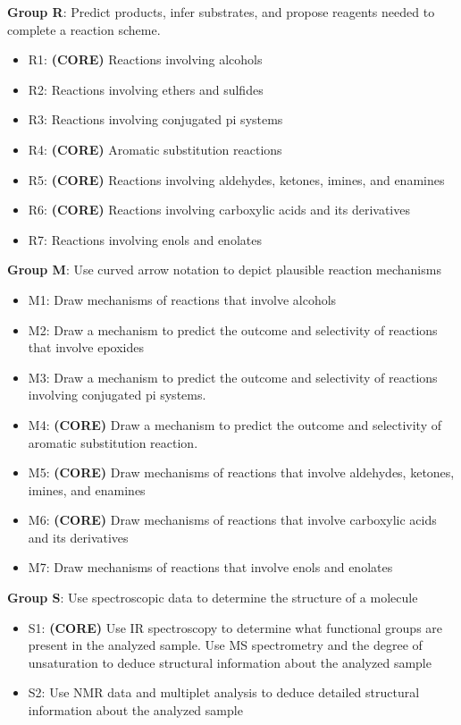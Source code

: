 \textbf{Group R}: Predict products, infer substrates, and propose
reagents needed to complete a reaction scheme.

\begin{itemize}
\tightlist
\item
  R1: \textbf{(CORE)} Reactions involving alcohols
\item
  R2: Reactions involving ethers and sulfides
\item
  R3: Reactions involving conjugated pi systems
\item
  R4: \textbf{(CORE)} Aromatic substitution reactions
\item
  R5: \textbf{(CORE)} Reactions involving aldehydes, ketones, imines,
  and enamines
\item
  R6: \textbf{(CORE)} Reactions involving carboxylic acids and its
  derivatives
\item
  R7: Reactions involving enols and enolates
\end{itemize}

\textbf{Group M}: Use curved arrow notation to depict plausible reaction
mechanisms

\begin{itemize}
\tightlist
\item
  M1: Draw mechanisms of reactions that involve alcohols
\item
  M2: Draw a mechanism to predict the outcome and selectivity of
  reactions that involve epoxides
\item
  M3: Draw a mechanism to predict the outcome and selectivity of
  reactions involving conjugated pi systems.
\item
  M4: \textbf{(CORE)} Draw a mechanism to predict the outcome and
  selectivity of aromatic substitution reaction.
\item
  M5: \textbf{(CORE)} Draw mechanisms of reactions that involve
  aldehydes, ketones, imines, and enamines
\item
  M6: \textbf{(CORE)} Draw mechanisms of reactions that involve
  carboxylic acids and its derivatives
\item
  M7: Draw mechanisms of reactions that involve enols and enolates
\end{itemize}

\textbf{Group S}: Use spectroscopic data to determine the structure of a
molecule

\begin{itemize}
\tightlist
\item
  S1: \textbf{(CORE)} Use IR spectroscopy to determine what functional
  groups are present in the analyzed sample. Use MS spectrometry and the
  degree of unsaturation to deduce structural information about the
  analyzed sample
\item
  S2: Use NMR data and multiplet analysis to deduce detailed structural
  information about the analyzed sample
\end{itemize}
